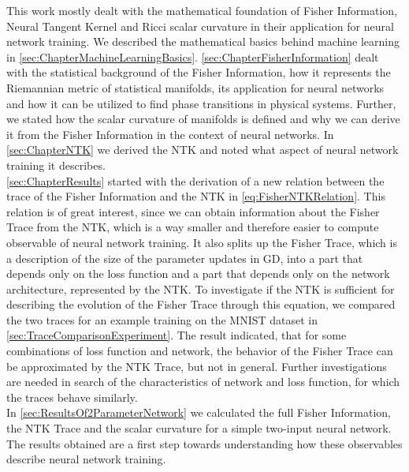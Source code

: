 This work mostly dealt with the mathematical foundation of Fisher Information, Neural Tangent Kernel and Ricci scalar curvature in their application for neural network training. We described the mathematical basics behind machine learning in \cref{sec:ChapterMachineLearningBasics}. \cref{sec:ChapterFisherInformation} dealt with the statistical background of the Fisher Information, how it represents the Riemannian metric of statistical manifolds, its application for neural networks and how it can be utilized to find phase transitions in physical systems. Further, we stated how the scalar curvature of manifolds is defined and why we can derive it from the Fisher Information in the context of neural networks. In \cref{sec:ChapterNTK} we derived the NTK and noted what aspect of neural network training it describes.\\
\cref{sec:ChapterResults} started with the derivation of a new relation between the trace of the Fisher Information and the NTK in \cref{eq:FisherNTKRelation}. This relation is of great interest, since we can obtain information about the Fisher Trace from the NTK, which is a way smaller and therefore easier to compute observable of neural network training. It also splits up the Fisher Trace, which is a description of the size of the parameter updates in GD, into a part that depends only on the loss function and a part that depends only on the network architecture, represented by the NTK. To investigate if the NTK is sufficient for describing the evolution of the Fisher Trace through this equation, we compared the two traces for an example training on the MNIST dataset in \cref{sec:TraceComparisonExperiment}. The result indicated, that for some combinations of loss function and network, the behavior of the Fisher Trace can be approximated by the NTK Trace, but not in general. Further investigations are needed in search of the characteristics of network and loss function, for which the traces behave similarly.\\
In \cref{sec:ResultsOf2ParameterNetwork} we calculated the full Fisher Information, the NTK Trace and the scalar curvature for a simple two-input neural network. The results obtained are a first step towards understanding how these observables describe neural network training.\\
